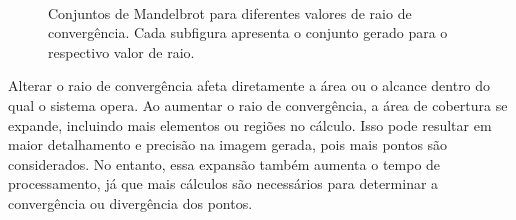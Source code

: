 \begin{enumerate}
\begin{figure}[H]
{        }
        \\
        \caption{Conjuntos de Mandelbrot para diferentes valores de raio de convergência. Cada subfigura apresenta o conjunto gerado para o respectivo valor de raio.}
\end{figure}


Alterar o raio de convergência afeta diretamente a área ou o alcance dentro do qual o sistema opera. Ao aumentar o raio de convergência, a área de cobertura se expande, incluindo mais elementos ou regiões no cálculo. Isso pode resultar em maior detalhamento e precisão na imagem gerada, pois mais pontos são considerados. No entanto, essa expansão também aumenta o tempo de processamento, já que mais cálculos são necessários para determinar a convergência ou divergência dos pontos.


\end{enumerate}
